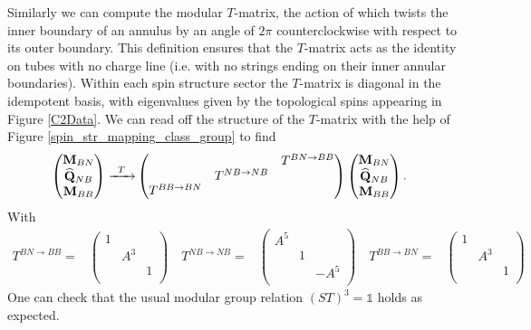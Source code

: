 \documentclass[12pt,a4paper]{article}
\newcounter{arrow}
\newcommand{\unit}{\mathds{1}}
\begin{document}
Similarly we can compute the modular $T$-matrix, the action of which twists the inner boundary of an annulus by an angle of $2\pi$ counterclockwise with respect to its outer boundary. 
This definition ensures that the $T$-matrix acts as the identity on tubes with no charge line (i.e. with no strings ending on their inner annular boundaries).
Within each spin structure sector the $T$-matrix is diagonal in the idempotent basis, with eigenvalues given by the topological spins appearing in Figure \ref{C2Data}. 
We can read off the structure of the $T$-matrix with the help of Figure \ref{spin_str_mapping_class_group} to find
\begin{align}
\left( \begin{matrix}
{\bf M}_{BN}\\
\widehat{{\bf Q} }_{NB}\\
{\bf M}_{BB}\\
\end{matrix} \right)
\xrightarrow{\;\; T \; \; } & \left( \begin{matrix}
&&T^{BN \rightarrow BB}\\
&T^{NB \rightarrow NB}&\\
T^{BB \rightarrow BN}&&\\
\end{matrix} \right)
\left( \begin{matrix}
{\bf M}_{BN}\\
\widehat{{\bf Q} }_{NB}\\
{\bf M}_{BB}\\
\end{matrix} \right).
\end{align}
With 
\begin{align}
T^{BN \rightarrow BB} =  & \left( \begin{matrix}
1&&\\
&A^3&\\
&&1\\
\end{matrix} \right)
\quad 
T^{NB \rightarrow NB}=  & \left( \begin{matrix}
A^5&&\\
&1&\\
&&-A^5\\
\end{matrix} \right)
\quad 
T^{BB \rightarrow BN}=  & \left( \begin{matrix}
1&&\\
&A^3&\\
&&1\\
\end{matrix} \right)
\end{align}
One can check that the usual modular group relation $(ST)^3 = \unit$ holds as expected. 
\end{document}
